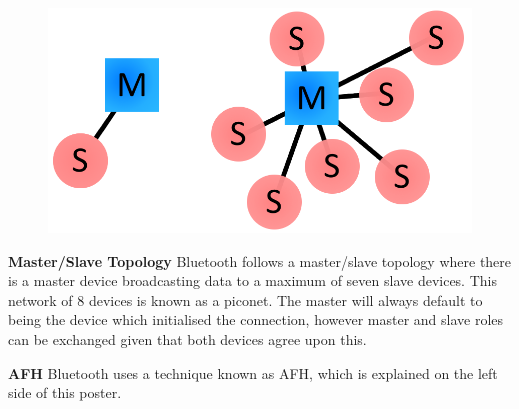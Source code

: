 \documentclass[a0paper,portrait]{baposter}
\begin{document}
\begin{poster}
{\begin{figure}
	{\includegraphics[scale=0.12]{master_slave_topology}} %
\end{figure}

\textbf{Master/Slave Topology}
Bluetooth follows a master/slave topology where there is a master device broadcasting data to a maximum of seven slave devices. This network of 8 devices is
known as a piconet. The master will always default to being the device which
initialised the connection, however master and slave roles can be exchanged
given that both devices agree upon this. 


\textbf{AFH}
Bluetooth uses a technique known as AFH, which is explained on the left side of this poster.
}

\end{poster}
\end{document}
